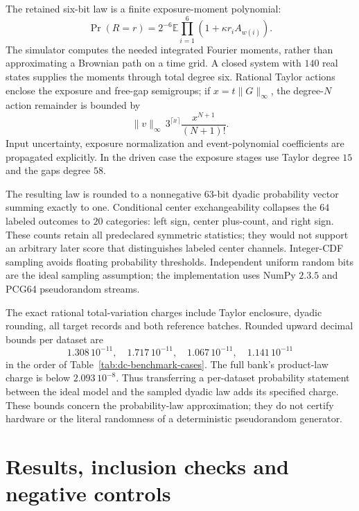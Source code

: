 The retained six-bit law is a finite exposure-moment polynomial:
\begin{equation}
 \Pr(R=r)=2^{-6}\mathbb E\prod_{i=1}^{6}
                (1+\kappa r_i A_{w(i)}).
 \label{eq:dc-bit-law}
\end{equation}
The simulator computes the needed integrated Fourier moments, rather than
approximating a Brownian path on a time grid.  A closed system with $140$
real states supplies the moments through total degree six.  Rational Taylor
actions enclose the exposure and free-gap semigroups; if
$x=t\|G\|_\infty$, the degree-$N$ action remainder is bounded by
\[
 \|v\|_\infty\,3^{\lceil x\rceil}\frac{x^{N+1}}{(N+1)!}.
\]
Input uncertainty, exposure normalization and event-polynomial coefficients
are propagated explicitly.  In the driven case the exposure stages use
Taylor degree $15$ and the gaps degree $58$.

The resulting law is rounded to a nonnegative $63$-bit dyadic probability
vector summing exactly to one.  Conditional center exchangeability collapses
the $64$ labeled outcomes to $20$ categories: left sign, center plus-count,
and right sign.  These counts retain all predeclared symmetric statistics;
they would not support an arbitrary later score that distinguishes labeled
center channels.  Integer-CDF sampling avoids floating probability thresholds.
Independent uniform random bits are the ideal sampling assumption; the
implementation uses NumPy $2.3.5$ and PCG64 pseudorandom streams.

The exact rational total-variation charges include Taylor enclosure,
dyadic rounding, all target records and both reference batches.  Rounded
upward decimal bounds per dataset are
\[
 1.308\,10^{-11},\quad 1.717\,10^{-11},\quad
 1.067\,10^{-11},\quad 1.141\,10^{-11}
\]
in the order of Table~\ref{tab:dc-benchmark-cases}.  The full bank's product-law
charge is below $2.093\,10^{-8}$.  Thus transferring a per-dataset probability
statement between the ideal model and the sampled dyadic law adds its
specified charge.  These bounds concern the probability-law approximation;
they do not certify hardware or the literal randomness of a deterministic
pseudorandom generator.

\section{Results, inclusion checks and negative controls}

